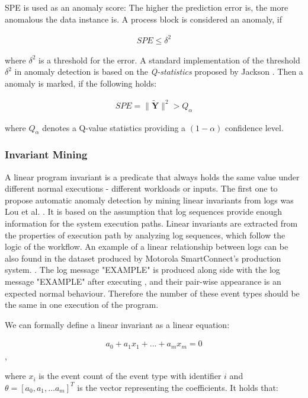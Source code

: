 SPE is used as an anomaly score: The higher the prediction error is, the more anomalous the data instance is. A process block is considered an anomaly, if  

\begin{gather}
     SPE \leq \delta^2
\end{gather}

where $\delta^2$ is a threshold for the error. A standard implementation of the threshold  $\delta^2$ in anomaly detection is based on the \textit{Q-statistics} proposed by Jackson \cite{pcaJackson1979}. Then a anomaly is marked, if the following holds: 

\begin{gather}
    SPE = \parallel \mathbf{\widetilde{Y}} \parallel^2 > Q_{\alpha} 
\end{gather}
 
 where $Q_{\alpha}$ denotes a Q-value statistics providing a $(1 - \alpha)$ confidence level. 

 \subsubsection{Invariant Mining}
 
A linear program invariant is a predicate that always holds the same value under different normal executions - different workloads or inputs. The first one to propose automatic anomaly detection by mining linear invariants from logs was Lou et al. \cite{lou2010}. It is based on the assumption that log sequences provide enough information for the system execution paths. Linear invariants are extracted from the properties of execution path by analyzing log sequences, which follow the logic of the workflow. An example of a linear relationship between logs can be also found in the dataset produced by Motorola SmartConnect's production system. . The log message "EXAMPLE" is produced along side with the log message "EXAMPLE" after executing , and their pair-wise appearance is an expected normal behaviour. Therefore the number of these event types should be the same in one execution of the program. 

We can formally define a linear invariant as a linear equation: 

\begin{gather}
    a_0 + a_1 x_1 + ... + a_m x_m = 0
\end{gather},

where $x_i$ is the event count of the event type with identifier $i$ and $\theta = [a_0, a_1, ... a_m]^T$ is the vector representing the coefficients. It holds that: 

